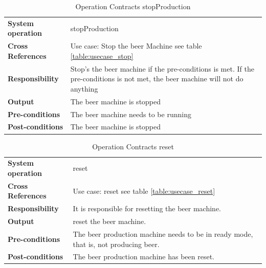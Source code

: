 \begin{table}[H]
    \begin{tabularx}{\textwidth}{|>{\RaggedRight}p{3.7cm}|>{\RaggedRight}X|}
        \hline
        \multicolumn{2}{|c|}{\textbf{stopProduction}}\\
        \hline
        \textbf{System operation} & stopProduction\\
        \hline
        \textbf{Cross References} & Use case: Stop the beer Machine see table \ref{table:usecase_stop}\\
        \hline
        \textbf{Responsibility} & Stop's the beer machine if the pre-conditions is met.
        If the pre-conditions is not met, the beer machine will not do anything\\
        \hline
        \textbf{Output} & The beer machine is stopped\\
        \hline
        \textbf{Pre-conditions} & The beer machine needs to be running\\
        \hline
        \textbf{Post-conditions} & The beer machine is stopped\\
        \hline
    \end{tabularx}
    \caption{Operation Contracts stopProduction} 
    \label{table:Operation_Contracts_stopProduction}
\end{table}


\begin{table}[H]
    \begin{tabularx}{\textwidth}{|>{\RaggedRight}p{3.7cm}|>{\RaggedRight}X|}
        \hline
        \multicolumn{2}{|c|}{\textbf{reset}}\\
        \hline
        \textbf{System operation} & reset \\
        \hline
        \textbf{Cross References} & Use case: reset see table \ref{table:usecase_reset} \\
        \hline
        \textbf{Responsibility} & It is responsible for resetting the beer 
                machine.\\
        \hline
        \textbf{Output} & reset the beer machine. \\
        \hline
        \textbf{Pre-conditions} & The beer production machine needs to be in
                ready mode, that is, not producing beer. \\
        \hline
        \textbf{Post-conditions} & The beer production machine has been reset. \\
        \hline
    \end{tabularx}
    \caption{Operation Contracts reset} 
    \label{table:Operation_Contracts_reset}
\end{table}

